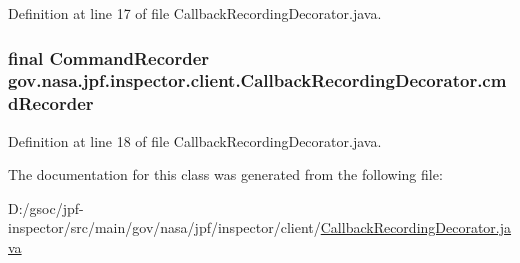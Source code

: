Definition at line 17 of file Callback\+Recording\+Decorator.\+java.

\subsubsection[{\texorpdfstring{cmd\+Recorder}{cmdRecorder}}]{\setlength{\rightskip}{0pt plus 5cm}final {\bf Command\+Recorder} gov.\+nasa.\+jpf.\+inspector.\+client.\+Callback\+Recording\+Decorator.\+cmd\+Recorder\hspace{0.3cm}{\ttfamily [private]}}\hypertarget{classgov_1_1nasa_1_1jpf_1_1inspector_1_1client_1_1_callback_recording_decorator_a5bfada9e89b8d63d85607b33b6acb0aa}{}\label{classgov_1_1nasa_1_1jpf_1_1inspector_1_1client_1_1_callback_recording_decorator_a5bfada9e89b8d63d85607b33b6acb0aa}


Definition at line 18 of file Callback\+Recording\+Decorator.\+java.



The documentation for this class was generated from the following file\+:\begin{DoxyCompactItemize}
\item 
D\+:/gsoc/jpf-\/inspector/src/main/gov/nasa/jpf/inspector/client/\hyperlink{_callback_recording_decorator_8java}{Callback\+Recording\+Decorator.\+java}\end{DoxyCompactItemize}
